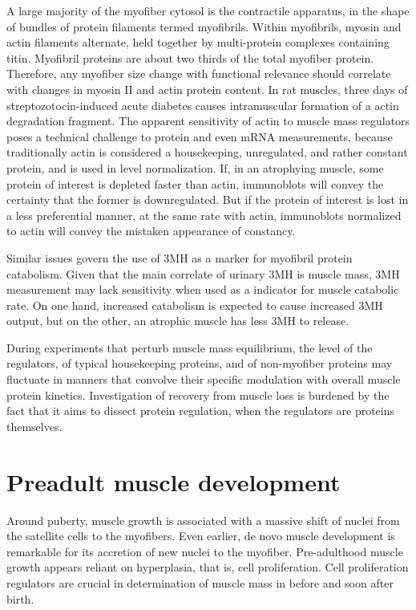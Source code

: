\documentclass[12pt,english]{report}\usepackage[]{graphicx}\usepackage[]{color}
\begin{document}
A large majority of the myofiber cytosol is the contractile apparatus,
in the shape of bundles of protein filaments termed myofibrils. Within
myofibrils, myosin and actin filaments alternate, held together by
multi-protein complexes containing titin. Myofibril proteins are about
two thirds of the total myofiber protein\citep{waterlow1978protein}.
Therefore, any myofiber size change with functional relevance should
correlate with changes in myosin II and actin protein content. In
rat muscles, three days of streptozotocin-induced acute diabetes causes
intramuscular formation of a actin degradation fragment\citep{du2004activation}.
The apparent sensitivity of actin to muscle mass regulators poses
a technical challenge to protein and even mRNA measurements, because
traditionally actin is considered a housekeeping, unregulated, and
rather constant protein, and is used in level normalization. If, in
an atrophying muscle, some protein of interest is depleted faster
than actin, immunoblots will convey the certainty that the former
is downregulated. But if the protein of interest is lost in a less
preferential manner, at the same rate with actin, immunoblots normalized
to actin will convey the mistaken appearance of constancy.

Similar issues govern the use of 3MH as a marker for myofibril protein
catabolism. Given that the main correlate of urinary 3MH is muscle
mass\citep{lukaski1981relationship}, 3MH measurement may lack sensitivity
when used as a indicator for muscle catabolic rate. On one hand, increased
catabolism is expected to cause increased 3MH output, but on the other,
an atrophic muscle has less 3MH to release.

During experiments that perturb muscle mass equilibrium, the level
of the regulators, of typical housekeeping proteins, and of non-myofiber
proteins may fluctuate in manners that convolve their specific modulation
with overall muscle protein kinetics. Investigation of recovery from
muscle loss is burdened by the fact that it aims to dissect protein
regulation, when the regulators are proteins themselves.


\section{Preadult muscle development}

Around puberty, muscle growth is associated with a massive shift of
nuclei from the satellite cells to the myofibers\citep{neal2012satellite}.
Even earlier, de novo muscle development is remarkable for its accretion
of new nuclei to the myofiber. Pre-adulthood muscle growth appears
reliant on hyperplasia, that is, cell proliferation. Cell proliferation
regulators are crucial in determination of muscle mass in before and
soon after birth.
\end{document}
